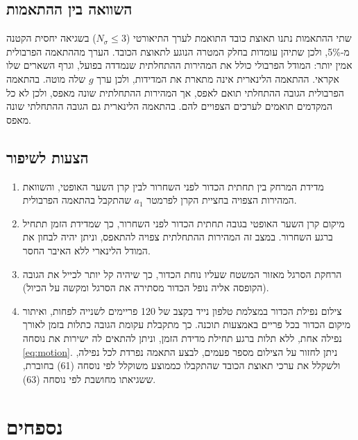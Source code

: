 \documentclass[10pt,a4paper]{article}
\newcommand{\added}[1]{\textcolor{addedblue}{#1}}
\newcommand{\partner}[1]{\textcolor{partnergreen}{#1}}
\begin{document}
\subsection*{\added{השוואה בין ההתאמות}}
\added{שתי ההתאמות נתנו תאוצת כובד התואמת לערך התיאורטי ($N_\sigma \le 3$) בשגיאה יחסית הקטנה מ-5\%, ולכן שתיהן עומדות בחלק המטרה הנוגע לתאוצת הכובד. הערך מההתאמה הפרבולית אמין יותר: המודל הפרבולי כולל את המהירות ההתחלתית שנמדדה בפועל, וגרף השארים שלו אקראי. ההתאמה הלינארית אינה מתארת את המדידות, ולכן ערך $g$ שלה מוטה.}
\partner{בהתאמה הפרבולית הגובה ההתחלתי תואם לאפס, אך המהירות ההתחלתית שונה מאפס, ולכן לא כל המקדמים תואמים לערכים הצפויים להם. בהתאמה הלינארית גם הגובה ההתחלתי שונה מאפס.}

\subsection*{\partner{הצעות לשיפור}}
\begin{enumerate}
  \item \added{מדידת המרחק בין תחתית הכדור לפני השחרור לבין קרן השער האופטי, והשוואת המהירות הצפויה בחציית הקרן לפרמטר $a_1$ שהתקבל בהתאמה הפרבולית.}
  \item \partner{מיקום קרן השער האופטי בגובה תחתית הכדור לפני השחרור, כך שמדידת הזמן תתחיל ברגע השחרור. במצב זה המהירות ההתחלתית צפויה להתאפס, וניתן יהיה לבחון את המודל הלינארי ללא האיבר החסר.}
  \item \partner{הרחקת הסרגל מאזור המשטח שעליו נוחת הכדור, כך שיהיה קל יותר לכייל את הגובה (הקופסה אליה נופל הכדור מסתירה את הסרגל ומקשה על הכיול).}
  \item \partner{צילום נפילת הכדור במצלמת טלפון נייד בקצב של 120 פריימים לשנייה לפחות, ואיתור מיקום הכדור בכל פריים באמצעות תוכנה. כך מתקבלת עקומת הגובה כתלות בזמן לאורך נפילה אחת, ללא תלות ברגע תחילת מדידת הזמן, וניתן להתאים לה ישירות את נוסחה \eqref{eq:motion}. ניתן לחזור על הצילום מספר פעמים, לבצע התאמה נפרדת לכל נפילה, ולשקלל את ערכי תאוצת הכובד שהתקבלו כממוצע משוקלל לפי נוסחה (61) בחוברת, ששגיאתו מחושבת לפי נוסחה (63).}
\end{enumerate}

\clearpage
\section*{נספחים}


\end{document}
